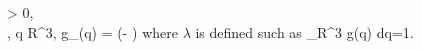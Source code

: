 \forall \sigma > 0, \\, \forall q \in \mathbb R^3, \quad g_\sigma(q) = \lambda \exp \left(- \right) \quad \textrm{where $\lambda$ is defined such as} \quad \int_{\mathbb R^3} g(q) dq=1.

